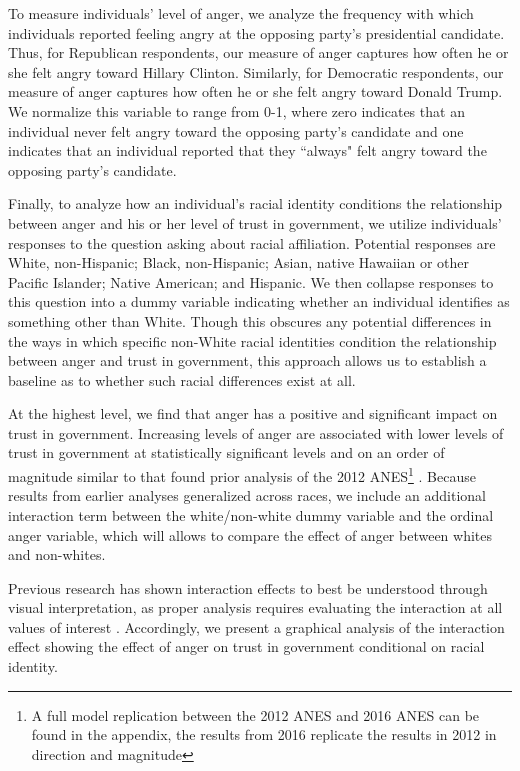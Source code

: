 \documentclass[12t, letterpaper]{article}
\begin{document}
To measure individuals' level of anger, we analyze the frequency with which individuals reported feeling angry at the opposing party's presidential candidate. Thus, for Republican respondents, our measure of anger captures how often he or she felt angry toward Hillary Clinton. Similarly, for Democratic respondents, our measure of anger captures how often he or she felt angry toward Donald Trump. We normalize this variable to range from 0-1, where zero indicates that an individual never felt angry toward the opposing party's candidate and one indicates that an individual reported that they ``always" felt angry toward the opposing party's candidate. 

Finally, to analyze how an individual's racial identity conditions the relationship between anger and his or her level of trust in government, we utilize individuals' responses to the question asking about racial affiliation. Potential responses are White, non-Hispanic; Black, non-Hispanic; Asian, native Hawaiian or other Pacific Islander; Native American; and Hispanic. We then collapse responses to this question into a dummy variable indicating whether an individual identifies as something other than White. Though this obscures any potential differences in the ways in which specific non-White racial identities condition the relationship between anger and trust in government, this approach allows us to establish a baseline as to whether such racial differences exist at all.

At the highest level, we find that anger has a positive and significant impact on trust in government. Increasing levels of anger are associated with lower levels of trust in government at statistically significant levels and on an order of magnitude similar to that found prior analysis of the 2012 ANES\footnote{A full model replication between the 2012 ANES and 2016 ANES can be found in the appendix, the results from 2016 replicate the results in 2012 in direction and magnitude} \citep{webster2017}. Because results from earlier analyses generalized across races, we include an additional interaction term between the white/non-white dummy variable and the ordinal anger variable, which will allows to compare the effect of anger between whites and non-whites.

Previous research has shown interaction effects to best be understood through visual interpretation, as proper analysis requires evaluating the interaction at all values of interest \citep{brambor2006}. Accordingly, we present a graphical analysis of the interaction effect showing the effect of anger on trust in government conditional on racial identity.
\end{document}

